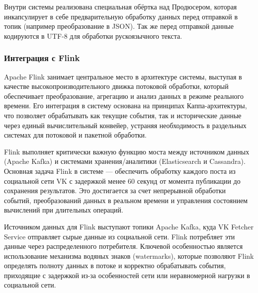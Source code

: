             Внутри системы реализована специальная обёртка над Продюсером, которая инкапсулирует в себе предварительную обработку данных перед отправкой в топик (например преобразование в JSON). Так же перед отправкой данные кодируются в UTF-8 для обработки рускоязычного текста.
            
        \subsubsection{Интеграция с Flink}
            Apache Flink занимает центральное место в архитектуре системы, выступая в качестве высокопроизводительного движка потоковой обработки, который обеспечивает преобразование, агрегацию и анализ данных в режиме реального времени. Его интеграция в систему основана на принципах Каппа-архитектуры, что позволяет обрабатывать как текущие события, так и исторические данные через единый вычислительный конвейер, устраняя необходимость в раздельных системах для потоковой и пакетной обработки.

            Flink выполняет критически важную функцию моста между источником данных (Apache Kafka) и системами хранения/аналитики (Elasticsearch и Cassandra). Основная задача Flink в системе — обеспечить обработку каждого поста из социальной сети VK с задержкой менее 60 секунд от момента публикации до сохранения результатов. Это достигается за счет непрерывной обработки событий, преобразований данных в реальном времени и управления состоянием вычислений при длительных операций. 

            Источником данных для Flink выступают топики Apache Kafka, куда VK Fetcher Service отправляет сырые данные из социальной сети. Flink потребляет эти данные через распределенного потребителя. Ключевой особенностью является использование механизма водяных знаков (watermarks), которые позволяют Flink определять полноту данных в потоке и корректно обрабатывать события, приходящие с задержкой из-за особенностей сети или неравномерной нагрузки в социальной сети.

